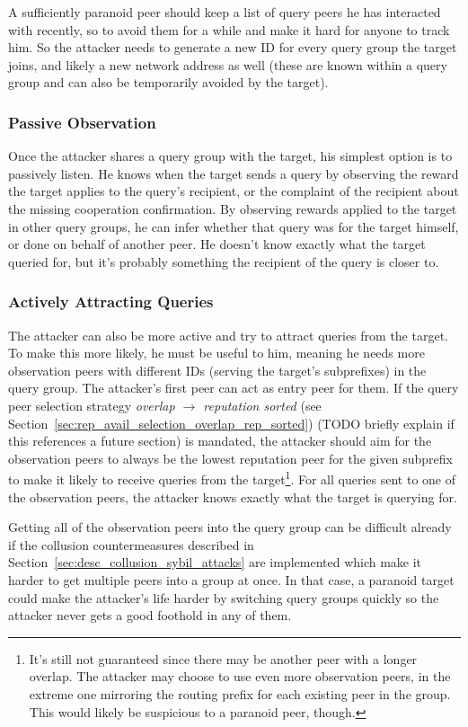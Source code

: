 A sufficiently paranoid peer should keep a list of query peers he has interacted
with recently, so to avoid them for a while and make it hard for anyone to track
him. So the attacker needs to generate a new ID for every query group the target
joins, and likely a new network address as well (these are known within a query
group and can also be temporarily avoided by the target).

\subsubsection{Passive Observation}
Once the attacker shares a query group with the target, his simplest option is
to passively listen. He knows when the target sends a query by observing the
reward the target applies to the query's recipient, or the complaint of the
recipient about the missing cooperation confirmation. By observing rewards
applied to the target in other query groups, he can infer whether that query was
for the target himself, or done on behalf of another peer. He doesn't know
exactly what the target queried for, but it's probably something the recipient
of the query is closer to.

\subsubsection{Actively Attracting Queries}
The attacker can also be more active and try to attract queries from the target.
To make this more likely, he must be useful to him, meaning he needs more
observation peers with different IDs (serving the target's subprefixes) in the
query group. The attacker's first peer can act as entry peer for them. If the
query peer selection strategy \emph{overlap $\rightarrow$ reputation sorted}
(see Section~\ref{sec:rep_avail_selection_overlap_rep_sorted}) (TODO briefly
explain if this references a future section) is mandated, the attacker should
aim for the observation peers to always be the lowest reputation peer for the
given subprefix to make it likely to receive queries from the
target\footnote{It's still not guaranteed since there may be another peer with a
longer overlap. The attacker may choose to use even more observation peers, in
the extreme one mirroring the routing prefix for each existing peer in the
group. This would likely be suspicious to a paranoid peer, though.}. For all
queries sent to one of the observation peers, the attacker knows exactly what
the target is querying for.

Getting all of the observation peers into the query group can be difficult
already if the collusion countermeasures described in
Section~\ref{sec:desc_collusion_sybil_attacks} are implemented which make it
harder to get multiple peers into a group at once. In that case, a paranoid
target could make the attacker's life harder by switching query groups quickly
so the attacker never gets a good foothold in any of them.


